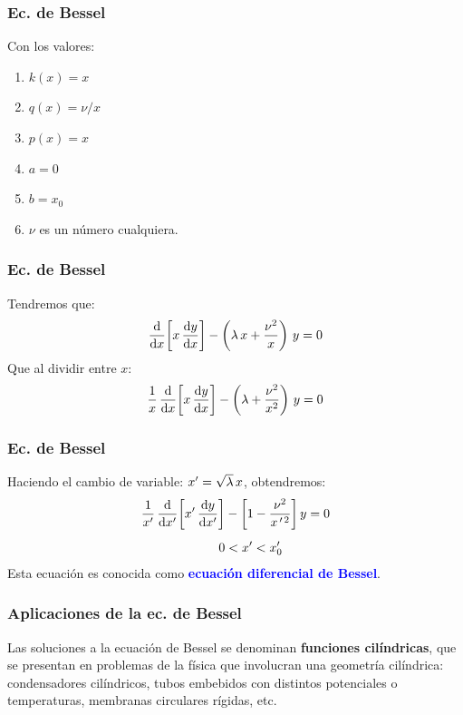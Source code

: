 \documentclass[12pt]{beamer}
\begin{document}
\begin{frame}
\frametitle{Ec. de Bessel}
Con los valores:
\pause
{}
\begin{multicols}{2}
\begin{enumerate}[<+->]
\item $k(x) = x$
\item $q(x) = \nu / x$
\item $p(x) = x$
\item $a = 0$
\item $b = x_{0}$
\item $\nu$ es un número cualquiera.
\end{enumerate}
\end{multicols}
\end{frame}
\begin{frame}
\frametitle{Ec. de Bessel}
Tendremos que:
\pause
\begin{align}
\dv{x} \bigg[ x \, \dv{y}{x} \bigg] -  \left( \lambda \, x  + \dfrac{\nu^{2}}{x} \right) \, y = 0
\label{eq:ecuacion_01_02}
\end{align}
\pause
Que al dividir entre $x$:
\pause
\begin{align}
\dfrac{1}{x} \, \dv{x} \bigg[ x \, \dv{y}{x} \bigg] -  \left( \lambda + \dfrac{\nu^{2}}{x^{2}} \right) \, y = 0
\label{eq:ecuacion_01_03}
\end{align}
\end{frame}
\begin{frame}
\frametitle{Ec. de Bessel}
Haciendo el cambio de variable: ${x}^{\prime} = \sqrt{\lambda} \, x$, obtendremos:
\pause
\begin{align}
\begin{aligned}
\dfrac{1}{{x}^{\prime}} \, \dv{\ensuremath{{x}^{\prime}}} \bigg[ {x}^{\prime} \, \dv{y}{\ensuremath{{x}^{\prime}}} \bigg] &-  \bigg[ 1 - \dfrac{\nu^{2}}{x^{\, \prime \, 2}} \bigg] \, y = 0 \\[0.5em]
0 &< {x}^{\prime} < {x}^{\prime}_{0}
\end{aligned}
\label{eq:ecuacion_01_04}
\end{align}
\pause
Esta ecuación es conocida como \textbf{\textcolor{blue}{ecuación diferencial de Bessel}}.
\end{frame}
\begin{frame}
\frametitle{Aplicaciones de la ec. de Bessel}
Las soluciones a la ecuación de Bessel se denominan \textbf{funciones cilíndricas}, que se presentan en problemas de la física que involucran una geometría cilíndrica: condensadores cilíndricos, tubos embebidos con distintos potenciales o temperaturas, membranas circulares rígidas, etc.
\end{frame}
\end{document}
